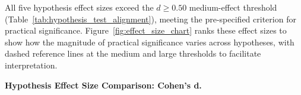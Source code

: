 All five hypothesis effect sizes exceed the $d \geq 0.50$ medium-effect threshold (Table~\ref{tab:hypothesis_test_alignment}), meeting the pre-specified criterion for practical significance. Figure~\ref{fig:effect_size_chart} ranks these effect sizes to show how the magnitude of practical significance varies across hypotheses, with dashed reference lines at the medium and large thresholds to facilitate interpretation.

\noindent\textbf{Hypothesis Effect Size Comparison: Cohen's d.}

